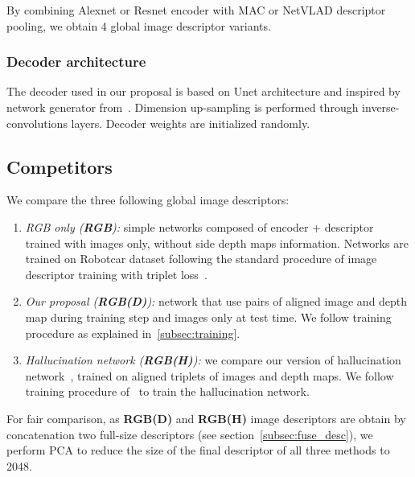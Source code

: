 By combining Alexnet or Resnet encoder with MAC or NetVLAD descriptor pooling, we obtain 4 global image descriptor variants.

\subsubsection{Decoder architecture}
The decoder used in our proposal is based on Unet architecture and inspired by network generator from~\cite{Isola2017}. Dimension up-sampling is performed through inverse-convolutions layers. Decoder weights are initialized randomly.

\subsection{Competitors}
\label{subsec:competitors}
We compare the three following global image descriptors:
\begin{enumerate}
    \item \textit{RGB only (\textbf{RGB}):} simple networks composed of encoder + descriptor trained with images only, without side depth maps information. Networks are trained on Robotcar dataset following the standard procedure of image descriptor training with triplet loss~\cite{Arandjelovic2017, Radenovic2017}.
    \item \textit{Our proposal (\textbf{RGB(D)}):} network that use pairs of aligned image and depth map during training step and images only at test time. We follow training procedure as explained in~\ref{subsec:training}.
	\item \textit{Hallucination network (\textbf{RGB(H)}):} we compare our version of hallucination network~\cite{Hoffman2016}, trained on aligned triplets of images and depth maps. We follow training procedure of~\cite{Hoffman2016} to train the hallucination network.
\end{enumerate}

For fair comparison, as \textbf{RGB(D)} and \textbf{RGB(H)} image descriptors are obtain by concatenation two full-size descriptors (see section~\ref{subsec:fuse_desc}), we perform PCA to reduce the size of the final descriptor of all three methods to 2048.